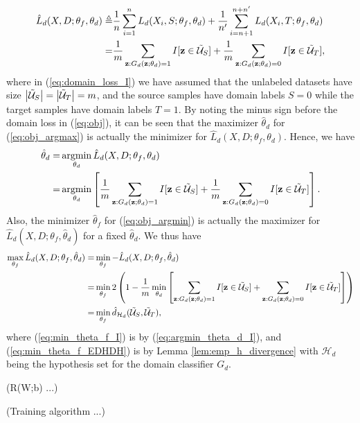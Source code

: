 \begin{align}
\hat{L}_{d}(X, D; \theta_f, \theta_d) \triangleq &
\frac{1}{n} \sum_{i=1}^{n} L_d(X_i, S; \theta_f, \theta_d)
+
\frac{1}{n'} \sum_{i=n+1}^{n + n'} L_d(X_i, T; \theta_f, \theta_d) \label{eq:domain_loss}\\
= & \frac{1}{m} \sum_{\mathbf{z}:G_d(\mathbf{z};\theta_d)=1}I[\mathbf{z} \in \tilde{\mathcal{U}}_S]+\frac{1}{m} \sum_{\mathbf{z}:G_d(\mathbf{z};\theta_d)=0}I[\mathbf{z} \in \tilde{\mathcal{U}}_T], \label{eq:domain_loss_I}
\end{align}
where in (\ref{eq:domain_loss_I}) we have assumed that the unlabeled datasets have size $\left \lvert \tilde{\mathcal{U}}_S \right \rvert=\left \lvert \tilde{\mathcal{U}}_T \right \rvert=m$, and the source samples have domain labels $S=0$ while the target samples have domain labels $T=1$. By noting the minus sign before the domain loss in (\ref{eq:obj}), it can be seen that the maximizer $\hat{\theta}_d$ for (\ref{eq:obj_argmax}) is actually the minimizer for $\hat{L}_{d}(X, D; \theta_f, \theta_d)$. Hence, we have
\begin{align}
\hat{\theta}_d
= & \mathop{\mathrm{argmin}}_{\theta_d} \hat{L}_{d}(X, D; \theta_f, \theta_d) \label{eq:argmin_theta_d}\\
= & \mathop{\mathrm{argmin}}_{\theta_d} \left[ \frac{1}{m} \sum_{\mathbf{z}:G_d(\mathbf{z};\theta_d)=1}I[\mathbf{z} \in \tilde{\mathcal{U}}_S]+\frac{1}{m} \sum_{\mathbf{z}:G_d(\mathbf{z};\theta_d)=0}I[\mathbf{z} \in \tilde{\mathcal{U}}_T] \right]. \label{eq:argmin_theta_d_I}
\end{align}
Also, the minimizer $\hat{\theta}_f$ for (\ref{eq:obj_argmin}) is actually the maximizer for $\hat{L}_{d}(X, D; \theta_f, \hat{\theta}_d)$ for a fixed $\hat{\theta}_d$. We thus have
\begin{align}
\max_{\theta_f}{\hat{L}_{d}(X, D; \theta_f, \hat{\theta}_d)}
=& \min_{\theta_f}{- \hat{L}_{d}(X, D; \theta_f, \hat{\theta}_d)} \label{eq:min_theta_f}\\
=& \min_{\theta_f} 2 \left( 1 - \frac{1}{m} \min_{\theta_d} \left[ \sum_{\mathbf{z}:G_d(\mathbf{z};\theta_d)=1}I[\mathbf{z} \in \tilde{\mathcal{U}}_S]+ \sum_{\mathbf{z}:G_d(\mathbf{z};\theta_d)=0}I[\mathbf{z} \in \tilde{\mathcal{U}}_T] \right] \right) \label{eq:min_theta_f_I}\\
=& \min_{\theta_f} \hat{d}_{\mathcal{H}_d}(\tilde{\mathcal{U}}_S, \tilde{\mathcal{U}}_T) \label{eq:min_theta_f_EDHDH},
\end{align}
where (\ref{eq:min_theta_f_I}) is by (\ref{eq:argmin_theta_d_I}), and (\ref{eq:min_theta_f_EDHDH}) is by Lemma \ref{lem:emp_h_divergence} with $\mathcal{H}_d$ being the hypothesis set for the domain classifier $G_d$.

(R(W;b) ...)

(Training algorithm ...)

